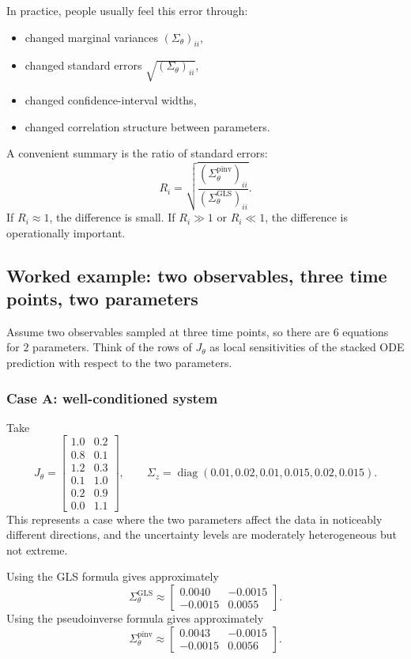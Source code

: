 \documentclass[11pt]{article}
\begin{document}
In practice, people usually feel this error through:
\begin{itemize}
    \item changed marginal variances $(\Sigma_\theta)_{ii}$,
    \item changed standard errors $\sqrt{(\Sigma_\theta)_{ii}}$,
    \item changed confidence-interval widths,
    \item changed correlation structure between parameters.
\end{itemize}

A convenient summary is the ratio of standard errors:
\[
R_i
=
\sqrt{
\frac{(\Sigma_\theta^{\mathrm{pinv}})_{ii}}
{(\Sigma_\theta^{\mathrm{GLS}})_{ii}}
}.
\]
If $R_i \approx 1$, the difference is small. If $R_i \gg 1$ or $R_i \ll 1$, the difference is operationally important.

\subsection*{Worked example: two observables, three time points, two parameters}
Assume two observables sampled at three time points, so there are $6$ equations for $2$ parameters. Think of the rows of $J_\theta$ as local sensitivities of the stacked ODE prediction with respect to the two parameters.

\subsubsection*{Case A: well-conditioned system}
Take
\[
J_\theta =
\begin{bmatrix}
1.0 & 0.2\\
0.8 & 0.1\\
1.2 & 0.3\\
0.1 & 1.0\\
0.2 & 0.9\\
0.0 & 1.1
\end{bmatrix},
\qquad
\Sigma_z =
\operatorname{diag}(0.01,0.02,0.01,0.015,0.02,0.015).
\]
This represents a case where the two parameters affect the data in noticeably different directions, and the uncertainty levels are moderately heterogeneous but not extreme.

Using the GLS formula gives approximately
\[
\Sigma_\theta^{\mathrm{GLS}}
\approx
\begin{bmatrix}
0.0040 & -0.0015\\
-0.0015 & 0.0055
\end{bmatrix}.
\]
Using the pseudoinverse formula gives approximately
\[
\Sigma_\theta^{\mathrm{pinv}}
\approx
\begin{bmatrix}
0.0043 & -0.0015\\
-0.0015 & 0.0056
\end{bmatrix}.
\]
\end{document}
